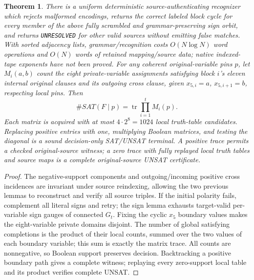 \documentclass[11pt]{article}
\newtheorem{theorem}{Theorem}
\begin{document}
\begin{theorem}
There is a uniform deterministic source-authenticating recognizer which rejects malformed encodings, returns the correct labeled block cycle for every member of the above fully scrambled and grammar-preserving sign orbit, and returns \texttt{UNRESOLVED} for other valid sources without emitting false matches. With sorted adjacency lists, grammar/recognition costs $O(N\log N)$ word operations and $O(N)$ words of retained mapping/source data; native indexed-tape exponents have not been proved.
For any coherent original-variable pins $p$, let $M_i(a,b)$ count the eight private-variable assignments satisfying block $i$'s eleven internal original clauses and its outgoing cross clause, given $x_{5,i}=a$, $x_{5,i+1}=b$, respecting local pins. Then
\[
\boxed{\#SAT(F\mid p)=\operatorname{tr}\prod_{i=1}^t M_i(p).}
\]
Each matrix is acquired with at most $4\cdot2^8=1024$ local truth-table candidates. Replacing positive entries with one, multiplying Boolean matrices, and testing the diagonal is a sound decision-only SAT/UNSAT terminal. A positive trace permits a checked original-source witness; a zero trace with fully replayed local truth tables and source maps is a complete original-source UNSAT certificate.
\end{theorem}
\begin{proof}
The negative-support components and outgoing/incoming positive cross incidences are invariant under source reindexing, allowing the two previous lemmas to reconstruct and verify all source triples. If the initial polarity fails, complement all literal signs and retry; the sign lemma exhausts target-valid per-variable sign gauges of connected $G_t$. Fixing the cyclic $x_5$ boundary values makes the eight-variable private domains disjoint. The number of global satisfying completions is the product of their local counts, summed over the two values of each boundary variable; this sum is exactly the matrix trace. All counts are nonnegative, so Boolean support preserves decision. Backtracking a positive boundary path gives a complete witness; replaying every zero-support local table and its product verifies complete UNSAT.
\end{proof}
\end{document}
